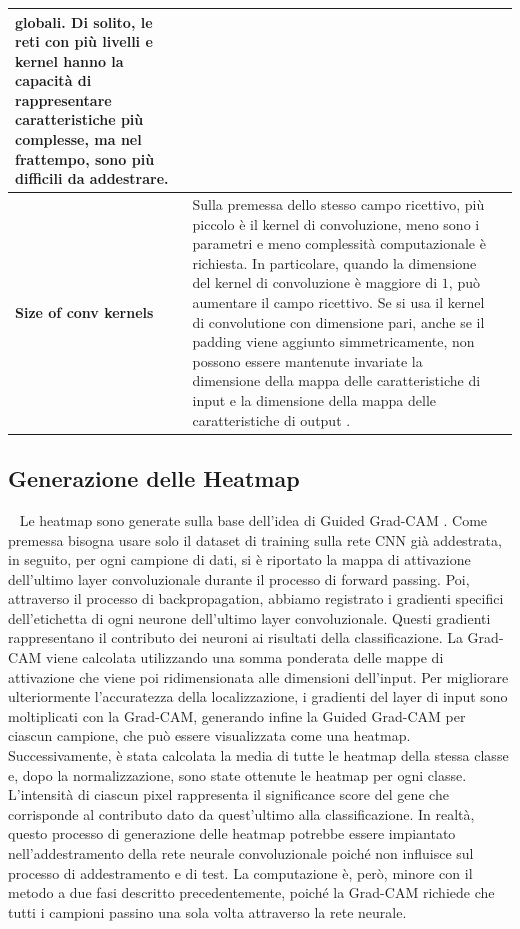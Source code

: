 \begin{table}[hpbt!]
\begin{tabular}{>{\bfseries}lp{}l}
         globali. Di solito, le reti con più livelli e kernel hanno la capacità di rappresentare caratteristiche più
         complesse, ma nel frattempo, sono più difficili da addestrare. \\
         \midrule
         Size of conv kernels & Sulla premessa dello stesso campo ricettivo, più piccolo è il kernel di convoluzione,
         meno sono i parametri e meno complessità computazionale è richiesta. In particolare, quando la dimensione del
         kernel di convoluzione è maggiore di $1$, può aumentare il campo ricettivo. Se si usa il kernel di convolutione
         con dimensione pari, anche se il padding viene aggiunto simmetricamente, non possono essere mantenute invariate
         la dimensione della mappa delle caratteristiche di input e la dimensione della mappa delle caratteristiche di
         output .\\
         \bottomrule
    \end{tabular}
    \normalsize
    \label{tab:Hyper_tab}
\end{table}

\subsection{Generazione delle Heatmap}~\newline
Le heatmap sono generate sulla base dell'idea di Guided Grad-CAM \cite{selvaraju2017grad}. Come premessa bisogna usare
solo il dataset di training sulla rete CNN già addestrata, in seguito, per ogni campione di dati, si è riportato la
mappa di attivazione dell'ultimo layer convoluzionale durante il processo di forward passing.
Poi, attraverso il processo di backpropagation, abbiamo registrato i gradienti specifici dell'etichetta di ogni neurone
dell'ultimo layer convoluzionale. Questi gradienti rappresentano il contributo dei neuroni ai risultati della
classificazione. La Grad-CAM viene calcolata utilizzando una somma ponderata delle mappe di attivazione che viene 
poi ridimensionata alle dimensioni dell'input. Per migliorare ulteriormente l'accuratezza della localizzazione, i
gradienti del layer di input sono moltiplicati con la Grad-CAM, generando infine la Guided Grad-CAM per ciascun
campione, che può essere visualizzata come una heatmap. 
Successivamente, è stata calcolata la media di tutte le heatmap della stessa classe e, dopo la normalizzazione, sono
state ottenute le heatmap per ogni classe. L'intensità di ciascun pixel rappresenta il significance score del gene 
che corrisponde al contributo dato da quest'ultimo alla classificazione.
In realtà, questo processo di generazione delle heatmap potrebbe essere impiantato nell'addestramento della rete 
neurale convoluzionale poiché non influisce sul processo di addestramento e di test.
La computazione è, però, minore con il metodo a due fasi descritto precedentemente, poiché la Grad-CAM richiede che
tutti i campioni passino una sola volta attraverso la rete neurale.

